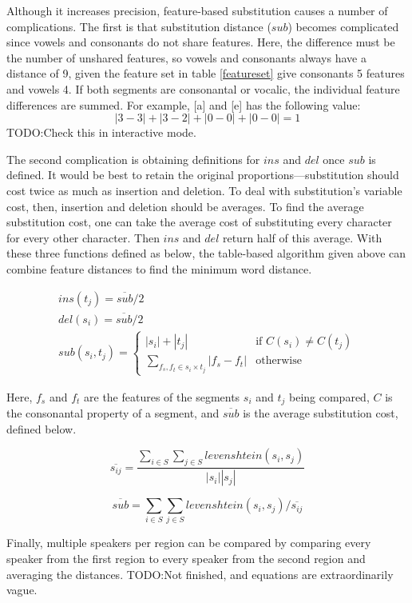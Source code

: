 \documentclass[11pt]{article}
\begin{document}
Although it increases precision, feature-based substitution causes a
number of complications. The first is that substitution distance
($sub$) becomes complicated since vowels and consonants do not share
features.  Here, the difference must be the number of unshared
features, so vowels and consonants always have a distance of 9, given
the feature set in table \ref{featureset} give consonants 5 features
and vowels 4.  If both segments are consonantal or vocalic, the
individual feature differences are summed.  For example, [a] and [e]
has the following value: \[ |3-3| + |3-2| + |0-0| + |0-0| = 1 \]
TODO:Check this in interactive mode.

The second complication is obtaining definitions for $ins$ and $del$
once $sub$ is defined. It would be best to retain the original
proportions---substitution should cost twice as much as insertion and
deletion. To deal with substitution's variable cost, then, insertion and
deletion should be averages. To find the average substitution cost, one can
 take the average cost of substituting every character
for every other character. Then $ins$ and $del$ return half of this
average. With these three functions defined as below, the table-based algorithm
given above can combine feature distances to find the minimum word distance.

\[ \begin{array}{l}
   ins(t_j) = \overline{sub} / 2 \\
   del(s_i) = \overline{sub} / 2 \\
   sub(s_i,t_j) = \left\{
     \begin{array}{ll}
       |s_i|+|t_j| & \textrm{if $C(s_i) \ne C(t_j)$} \\
       \sum_{f_s,f_t \in s_i \times t_j} |f_s - f_t| & \textrm{otherwise}
     \end{array} \right.

   \end{array}
\]

Here, $f_s$ and $f_t$ are the features of the segments $s_i$ and $t_j$
being compared, $C$ is the consonantal property of a segment, and
$\overline{sub}$ is the average substitution cost, defined below.

\[ \overline{s_{ij}} = \frac{\sum_{i \in S}\sum_{j \in S}{levenshtein(s_i,s_j)}}{|s_i||s_j|}\]

\[ \overline{sub} = \sum_{i \in S}\sum_{j \in S}levenshtein(s_i,s_j) / \overline{s_{ij}} \]

Finally, multiple speakers per region can be compared by comparing
every speaker from the first region to every speaker from the second
region and averaging the distances.
TODO:Not finished, and equations are extraordinarily vague.
\end{document}
